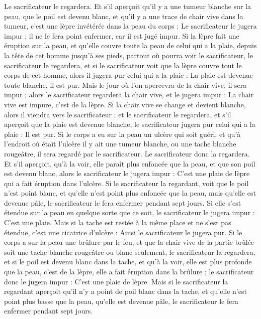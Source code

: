 \begin{multicols}{2}
Le sacrificateur le regardera. Et s'il aperçoit qu'il y a une tumeur blanche sur la peau, que le poil est devenu blanc, et qu'il y a une trace de chair vive dans la tumeur,
c'est une lèpre invétérée dans la peau du corps : Le sacrificateur le jugera impur ; il ne le fera point enfermer, car il est jugé impur.
Si la lèpre fait une éruption sur la peau, et qu'elle couvre toute la peau de celui qui a la plaie, depuis la tête de cet homme jusqu'à ses pieds, partout où pourra voir le sacrificateur, le sacrificateur le regardera,
et si le sacrificateur voit que la lèpre couvre tout le corps de cet homme, alors il jugera pur celui qui a la plaie : La plaie est devenue toute blanche, il est pur.
Mais le jour où l'on apercevra de la chair vive, il sera impur ;
alors le sacrificateur regardera la chair vive, et le jugera impur : La chair vive est impure, c'est de la lèpre.
Si la chair vive se change et devient blanche, alors il viendra vers le sacrificateur ;
et le sacrificateur le regardera, et s’il aperçoit que la plaie est devenue blanche, le sacrificateur jugera pur celui qui a la plaie : Il est pur.
Si le corps a eu sur la peau un ulcère qui soit guéri,
et qu'à l'endroit où était l'ulcère il y ait une tumeur blanche, ou une tache blanche rougeâtre, il sera regardé par le sacrificateur.
Le sacrificateur donc la regardera. Et s'il aperçoit, qu'à la voir, elle paraît plus enfoncée que la peau, et que son poil est devenu blanc, alors le sacrificateur le jugera impur : C'est une plaie de lèpre qui a fait éruption dans l'ulcère.
Si le sacrificateur la regardant, voit que le poil n'est point blanc, et qu'elle n'est point plus enfoncée que la peau, mais qu'elle est devenue pâle, le sacrificateur le fera enfermer pendant sept jours.
Si elle s'est étendue sur la peau en quelque sorte que ce soit, le sacrificateur le jugera impur : C'est une plaie.
Mais si la tache est restée à la même place et ne s'est pas étendue, c'est une cicatrice d'ulcère : Ainsi le sacrificateur le jugera pur.
Si le corps a sur la peau une brûlure par le feu, et que la chair vive de la partie brûlée soit une tache blanche rougeâtre ou blanc seulement, le sacrificateur la regardera,
et si le poil est devenu blanc dans la tache, et qu'à la voir, elle est plus profonde que la peau, c'est de la lèpre, elle a fait éruption dans la brûlure ; le sacrificateur donc le jugera impur : C'est une plaie de lèpre.
Mais si le sacrificateur la regardant aperçoit qu'il n'y a point de poil blanc dans la tache, et qu'elle n'est point plus basse que la peau, qu'elle est devenue pâle, le sacrificateur le fera enfermer pendant sept jours.

\end{multicols}
